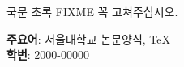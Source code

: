 \documentclass[doctor]{snuee}
\begin{document}
	
	
	
	
	
	
	


%
\begin{summary}
	\par    %
	국문 초록 FIXME 꼭 고쳐주십시오. 
	
	\lipsum[1-3]
	\lipsum[1-3]
	\vfill
	\begin{minipage}[t][20mm][b]{\textwidth}
		{\bfseries 주요어}: 서울대학교 논문양식, TeX\\
		{\bfseries 학번}: 2000-00000\\
	\end{minipage}
\end{summary}
\changepage {-15mm}{}{}{}{}{}{}{}{15mm} %
\end{document}
